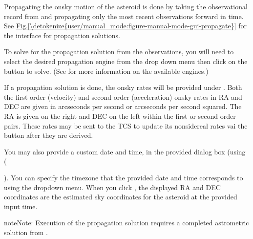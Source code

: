 \documentclass[letterpaper,11pt,english]{sphinxmanual}
\begin{document}
\sphinxAtStartPar
Propagating the on\sphinxhyphen{}sky motion of the asteroid is done by taking the
observational record from
{\hyperref[\detokenize{user/manual_mode:user-manual-mode-procedure-asteroid-observation-record}]{}} and propagating
only the most recent observations forward in time. See
\hyperref[\detokenize{user/manual_mode:figure-manual-mode-gui-propagate}]{Fig.\@ \ref{\detokenize{user/manual_mode:figure-manual-mode-gui-propagate}}} for the interface for propagation
solutions.

\sphinxAtStartPar
To solve for the propagation solution from the observations, you will need to
select the desired propagation engine from the drop down menu then click on the
 button to solve.
(See {\hyperref[\detokenize{technical/architecture/services_engines:technical-architecture-services-engines}]{}} for more information on
the available engines.)

\sphinxAtStartPar
If a propagation solution is done, the on\sphinxhyphen{}sky rates will be provided under
. Both the first order (velocity) and
second order (acceleration) on\sphinxhyphen{}sky rates in RA and DEC are given in arcseconds
per second or arcseconds per second squared. The RA is given on the right and
DEC on the left within the first or second order pairs. These rates may be
sent to the TCS to update its non\sphinxhyphen{}sidereal rates vai the
 button after they are derived.

\sphinxAtStartPar
You may also provide a custom date and time, in the provided dialog box (using
(%
\begin{footnote}[7]\sphinxAtStartFootnote
{}
%
\end{footnote}). You
can specify the timezone that the provided date and time corresponds to using
the dropdown menu. When you click , the displayed RA
and DEC coordinates are the estimated sky coordinates for the asteroid at the
provided input time.

\begin{sphinxadmonition}{note}{Note:}
\sphinxAtStartPar
Execution of the propagation solution requires a completed astrometric
solution from
{\hyperref[\detokenize{user/manual_mode:user-manual-mode-procedure-find-asteroid-location-compute-astrometric-solution}]{}}.
\end{sphinxadmonition}
\end{document}
